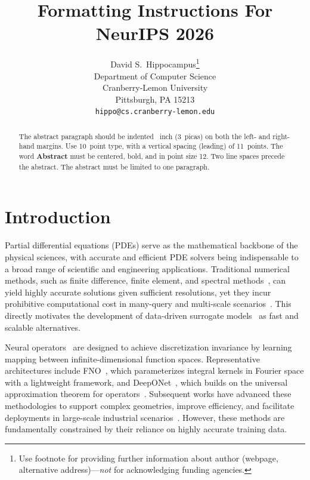 \documentclass{article}
\title{Formatting Instructions For NeurIPS 2026}
\author{%
  David S.~Hippocampus\thanks{Use footnote for providing further information
    about author (webpage, alternative address)---\emph{not} for acknowledging
    funding agencies.} \\
  Department of Computer Science\\
  Cranberry-Lemon University\\
  Pittsburgh, PA 15213 \\
  \texttt{hippo@cs.cranberry-lemon.edu} \\
}
\begin{document}
\maketitle


\begin{abstract}
  The abstract paragraph should be indented ~inch (3~picas) on both the left- and right-hand margins. Use 10~point type, with a vertical spacing (leading) of 11~points. The word \textbf{Abstract} must be centered, bold, and in point size 12. Two line spaces precede the abstract. The abstract must be limited to one paragraph.
\end{abstract}



\section{Introduction}
Partial differential equations (PDEs) serve as the mathematical backbone of the physical sciences, with accurate and efficient PDE solvers being indispensable to a broad range of scientific and engineering applications. Traditional numerical methods, such as finite difference, finite element, and spectral methods~\cite{evans2010partial,leveque2007finite}, can yield highly accurate solutions given sufficient resolutions, yet they incur prohibitive computational cost in many-query and multi-scale scenarios~\cite{karniadakis2021physics}. This directly motivates the development of data-driven surrogate models~\cite{mccabe2024mpp, herde2024poseidon} as fast and scalable alternatives.

Neural operators~\cite{kovachki2023neural} are designed to achieve discretization invariance by learning mapping between infinite-dimensional function spaces. Representative architectures include FNO~\cite{li2021fourier}, which parameterizes integral kernels in Fourier space with a lightweight framework, and DeepONet~\cite{lu2021deeponet}, which builds on the universal approximation theorem for operators~\cite{chen1995universal}. Subsequent works have advanced these methodologies to support complex geometries, improve efficiency, and facilitate deployments in large-scale industrial scenarios~\cite{li2023geo,wu2024transolver,wen2025gaot}. However, these methods are fundamentally constrained by their reliance on highly accurate training data. 
\end{document}
